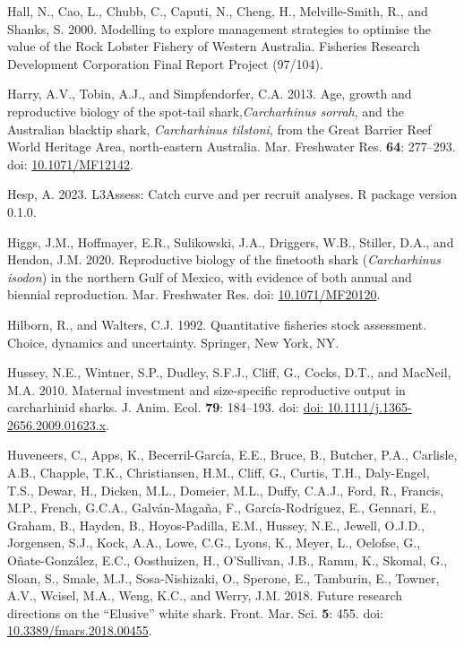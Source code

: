 \documentclass[
]{article}
\newenvironment{CSLReferences}%
  {}%
  {\par}
\begin{document}
\begin{CSLReferences}{1}{0}
Hall, N., Cao, L., Chubb, C., Caputi, N., Cheng, H., Melville-Smith, R., and Shanks, S. 2000. Modelling to explore management strategies to optimise the value of the {Rock} {Lobster} {Fishery} of {Western} {Australia}. Fisheries Research Development Corporation Final Report Project (97/104).

Harry, A.V., Tobin, A.J., and Simpfendorfer, C.A. 2013. Age, growth and reproductive biology of the spot-tail shark,\emph{{Carcharhinus} sorrah}, and the {Australian} blacktip shark, \emph{{Carcharhinus} tilstoni}, from the {Great} {Barrier} {Reef} {World} {Heritage} {Area}, north-eastern {Australia}. Mar. Freshwater Res. \textbf{64}: 277--293. doi: \href{https://doi.org/10.1071/MF12142}{10.1071/MF12142}.

Hesp, A. 2023. {L3Assess}: {Catch} curve and per recruit analyses. R package version 0.1.0.

Higgs, J.M., Hoffmayer, E.R., Sulikowski, J.A., Driggers, W.B., Stiller, D.A., and Hendon, J.M. 2020. Reproductive biology of the finetooth shark (\emph{{Carcharhinus} isodon}) in the northern {Gulf} of {Mexico}, with evidence of both annual and biennial reproduction. Mar. Freshwater Res. doi: \href{https://doi.org/10.1071/MF20120}{10.1071/MF20120}.

Hilborn, R., and Walters, C.J. 1992. Quantitative fisheries stock assessment. Choice, dynamics and uncertainty. Springer, New York, NY.

Hussey, N.E., Wintner, S.P., Dudley, S.F.J., Cliff, G., Cocks, D.T., and MacNeil, M.A. 2010. Maternal investment and size-specific reproductive output in carcharhinid sharks. J. Anim. Ecol. \textbf{79}: 184--193. doi: \href{https://doi.org/doi:\%2010.1111/j.1365-2656.2009.01623.x}{doi: 10.1111/j.1365-2656.2009.01623.x}.

Huveneers, C., Apps, K., Becerril-García, E.E., Bruce, B., Butcher, P.A., Carlisle, A.B., Chapple, T.K., Christiansen, H.M., Cliff, G., Curtis, T.H., Daly-Engel, T.S., Dewar, H., Dicken, M.L., Domeier, M.L., Duffy, C.A.J., Ford, R., Francis, M.P., French, G.C.A., Galván-Magaña, F., García-Rodríguez, E., Gennari, E., Graham, B., Hayden, B., Hoyos-Padilla, E.M., Hussey, N.E., Jewell, O.J.D., Jorgensen, S.J., Kock, A.A., Lowe, C.G., Lyons, K., Meyer, L., Oelofse, G., Oñate-González, E.C., Oosthuizen, H., O'Sullivan, J.B., Ramm, K., Skomal, G., Sloan, S., Smale, M.J., Sosa-Nishizaki, O., Sperone, E., Tamburin, E., Towner, A.V., Wcisel, M.A., Weng, K.C., and Werry, J.M. 2018. Future research directions on the {``{Elusive}''} white shark. Front. Mar. Sci. \textbf{5}: 455. doi: \href{https://doi.org/10.3389/fmars.2018.00455}{10.3389/fmars.2018.00455}.


\end{CSLReferences}
\end{document}

